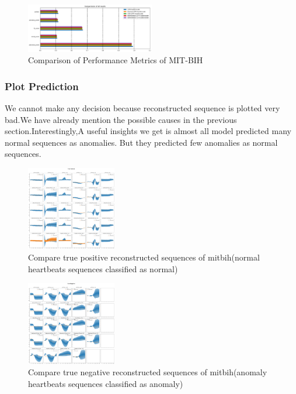 \documentclass[nonacm,sigconf]{acmart}
\begin{document}
\begin{figure}[h]
  \centering
  \includegraphics[width=0.5\textwidth]{MIT-BIH/performance.png}
  \caption{Comparison of Performance Metrics of MIT-BIH}
  \label{tab:Fig2}
\end{figure}



\subsubsection{\textbf{Plot Prediction}}
We cannot make any decision because reconstructed sequence is plotted very bad.We have already mention the possible causes in the previous 
section.Interestingly,A useful insights we get is almost all model predicted many normal sequences as anomalies. But they predicted few anomalies as normal sequences.
    \begin{figure}
        \centering
        \includegraphics[width=0.35\textwidth]{MIT-BIH/TP.png}
        \caption{Compare true positive reconstructed sequences of mitbih(normal heartbeats sequences classified as normal)}
        \label{fig:image1}
    \end{figure}%
        \begin{figure}
        \centering
        \includegraphics[width=0.35\textwidth]{MIT-BIH/TN.png}
        \caption{Compare true negative reconstructed sequences of mitbih(anomaly heartbeats sequences classified as anomaly)}
        \label{fig:image1}
    \end{figure}%
\end{document}
